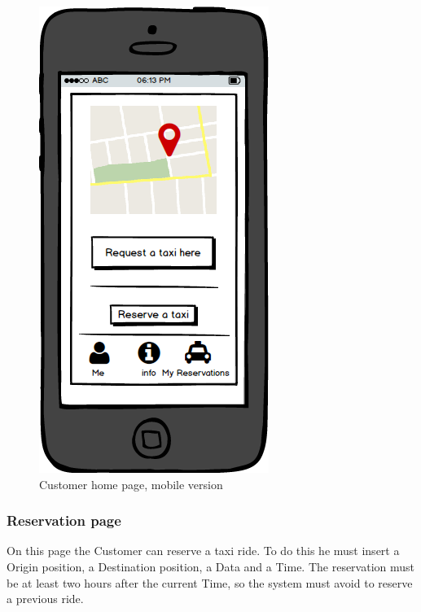 \documentclass{report}
\begin{document}
				\begin{figure}[H]
					\centering
					\includegraphics[scale=0.4]{IMG/UserInterfaces/mainCustomer_m.png}
					\caption{Customer home page, mobile version}\label{chome_m}
				\end{figure}
			
			\subsubsection{Reservation page}
			On this page the Customer can reserve a taxi ride. To do this he must insert a Origin position, a Destination position, a Data and a Time. The reservation must be at least two hours after the current Time, so the system must avoid to reserve a previous ride.
			
\end{document}
